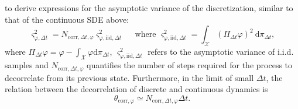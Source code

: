 \documentclass{article}
\newtheorem{assumption}[theorem]{Assumption}
\begin{document}
to derive expressions for the asymptotic variance of the discretization, similar to that of the continuous SDE above:
\begin{equation}
\varsigma_{\varphi, \Delta t}^2=N_{\mathrm{corr}, \Delta t, \varphi} \varsigma_{\varphi, \mathrm{iid}, \Delta t}^2 \quad \text { where } \varsigma_{\varphi, \mathrm{iid}, \Delta t}^2=\int_{\mathcal{X}}\left(\Pi_{\Delta t} \varphi\right)^2 \mathrm{~d} \pi_{\Delta t},
\end{equation}
where $\Pi_{\Delta t} \varphi=\varphi-\int_{\mathcal{X}} \varphi \mathrm{d} \pi_{\Delta t}$, $\varsigma_{\varphi, \mathrm{iid}, \Delta t}^2$ refers to the asymptotic variance of i.i.d. samples and $N_{\mathrm{corr}, \Delta t, \varphi}$ quantifies the number of steps required for the process to decorrelate from its previous state. Furthermore, in the limit of small $\Delta t$, the relation between the decorrelation of discrete and continuous dynamics is
$$\theta_{\mathrm{corr}, \varphi} \simeq N_{\mathrm{corr}, \Delta t, \varphi} \Delta t.$$

\end{document}
